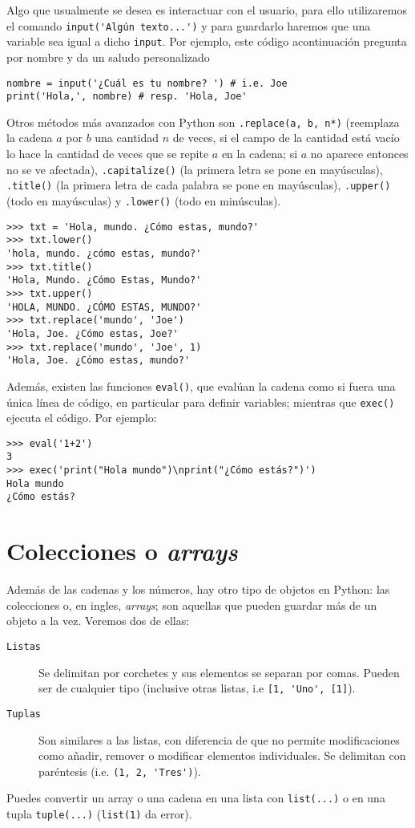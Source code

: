 \documentclass[11pt,twoside]{report}
\begin{document}
Algo que usualmente se desea es interactuar con el usuario, para ello utilizaremos el comando \lstinline|input('Algún texto...')| y para guardarlo haremos que una variable sea igual a dicho \texttt{input}. Por ejemplo, este código acontinuación pregunta por nombre y da un saludo personalizado
\begin{lstlisting}
nombre = input('¿Cuál es tu nombre? ') # i.e. Joe
print('Hola,', nombre) # resp. 'Hola, Joe'
\end{lstlisting}
Otros métodos más avanzados con Python son \lstinline|.replace(a, b, n*)| (reemplaza la cadena $a$ por $b$ una cantidad $n$ de veces, si el campo de la cantidad está vacío lo hace la cantidad de veces que se repite $a$ en la cadena; si $a$ no aparece entonces no se ve afectada), \lstinline|.capitalize()| (la primera letra se pone en mayúsculas), \lstinline|.title()| (la primera letra de cada palabra se pone en mayúsculas), \lstinline|.upper()| (todo en mayúsculas) y \lstinline|.lower()| (todo en minúsculas).
\begin{lstlisting}
>>> txt = 'Hola, mundo. ¿Cómo estas, mundo?'
>>> txt.lower()
'hola, mundo. ¿cómo estas, mundo?'
>>> txt.title()
'Hola, Mundo. ¿Cómo Estas, Mundo?'
>>> txt.upper()
'HOLA, MUNDO. ¿CÓMO ESTAS, MUNDO?'
>>> txt.replace('mundo', 'Joe')
'Hola, Joe. ¿Cómo estas, Joe?'
>>> txt.replace('mundo', 'Joe', 1)
'Hola, Joe. ¿Cómo estas, mundo?'
\end{lstlisting}
Además, existen las funciones \lstinline|eval()|, que evalúan la cadena como si fuera una única línea de código, en particular para definir variables; mientras que \lstinline|exec()| ejecuta el código. Por ejemplo:
\begin{lstlisting}
>>> eval('1+2')
3
>>> exec('print("Hola mundo")\nprint("¿Cómo estás?")')
Hola mundo
¿Cómo estás?
\end{lstlisting}

\section{Colecciones o \textit{arrays}}
Además de las cadenas y los números, hay otro tipo de objetos en Python: las colecciones o, en ingles, \textit{arrays}; son aquellas que pueden guardar más de un objeto a la vez. Veremos dos de ellas:
\begin{description}
\item[\tt Listas] Se delimitan por corchetes y sus elementos se separan por comas. Pueden ser de cualquier tipo (inclusive otras listas, i.e \lstinline|[1, 'Uno', [1]|).
\item[\tt Tuplas] Son similares a las listas, con diferencia de que no permite modificaciones como añadir, remover o modificar elementos individuales. Se delimitan con paréntesis (i.e. \lstinline|(1, 2, 'Tres')|).
\end{description}
Puedes convertir un array o una cadena en una lista con \lstinline|list(...)| o en una tupla \lstinline|tuple(...)| (\lstinline|list(1)| da error).
\end{document}
